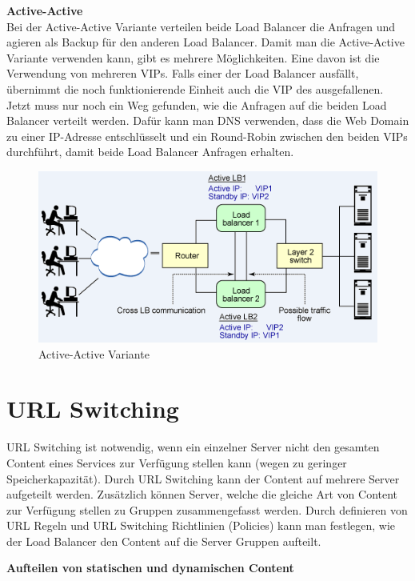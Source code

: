 \textbf{Active-Active} \\

Bei der Active-Active Variante verteilen beide Load Balancer die Anfragen und agieren als Backup für den anderen Load Balancer. Damit man die Active-Active Variante verwenden kann, gibt es mehrere Möglichkeiten. Eine davon ist die Verwendung von mehreren VIPs. Falls einer der Load Balancer ausfällt, übernimmt die noch funktionierende Einheit auch die VIP des ausgefallenen. Jetzt muss nur noch ein Weg gefunden, wie die Anfragen auf die beiden Load Balancer verteilt werden. Dafür kann man DNS verwenden, dass die Web Domain zu einer IP-Adresse entschlüsselt und ein Round-Robin zwischen den beiden VIPs durchführt, damit beide Load Balancer Anfragen erhalten.  
\begin{figure}[!h]
	\begin{center}
		\includegraphics[width=0.6\linewidth]{images/loadbalancing14.png}
		\caption{Active-Active Variante \cite{LoadBalancingGrafik3}}
		\label{Active-Active Variante}
	\end{center}
\end{figure}

\pagebreak
\section{URL Switching}
\label{sec:URL Switching}

URL Switching ist notwendig, wenn ein einzelner Server nicht den gesamten Content eines Services zur Verfügung stellen kann (wegen zu geringer Speicherkapazität). Durch URL  Switching kann der Content auf mehrere Server aufgeteilt werden. Zusätzlich können Server, welche die gleiche Art von Content zur Verfügung stellen zu Gruppen zusammengefasst werden. Durch definieren von URL Regeln und URL Switching Richtlinien (Policies) kann man festlegen, wie der Load Balancer den Content auf die Server Gruppen aufteilt.\vspace{5mm}

\textbf{Aufteilen von statischen und dynamischen Content} \\

